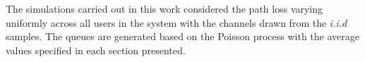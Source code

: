 
The simulations carried out in this work considered the path loss varying uniformly across all users in the system with the channels drawn from the \textit{i.i.d} samples. The queues are generated based on the Poisson process with the average values specified in each section presented. 